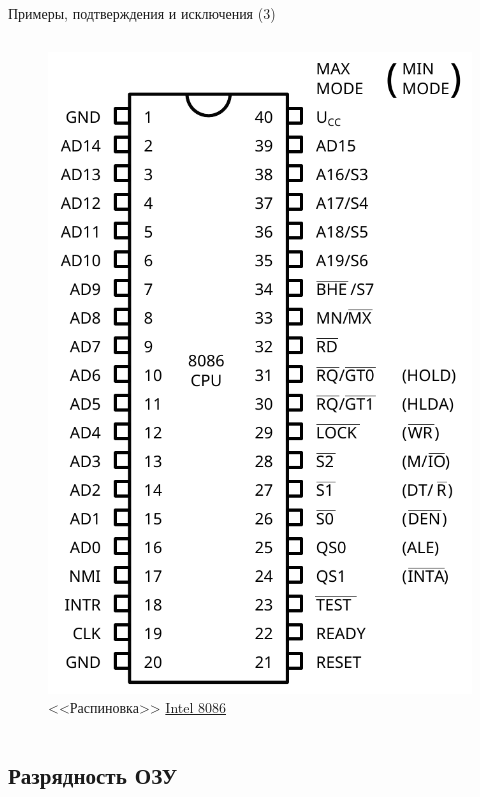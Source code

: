 \documentclass[xetex,aspectratio=43]{beamer}
\begin{document}
\begin{frame}{Примеры, подтверждения и исключения (3)}
\begin{columns}
\begin{column}{0.5\textwidth}
\begin{figure}
            \includegraphics[height=0.75\textheight]{img/05.Intel_8086_pinout.pdf}
            \caption{<<Распиновка>> \href{https://en.wikipedia.org/wiki/Intel_8086}{Intel 8086}}
        \end{figure}
    \end{column}
\end{columns}

\end{frame}

\subsection{Разрядность ОЗУ}
\end{document}
